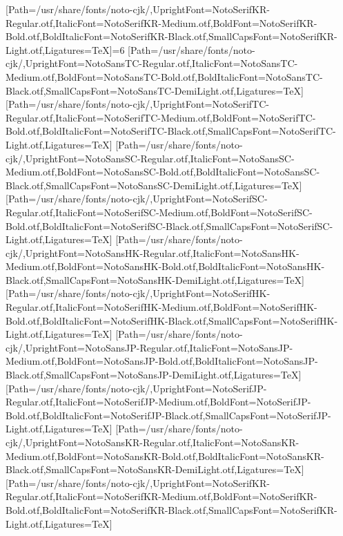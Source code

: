 \newfontfamily{}[Path=/usr/share/fonts/noto-cjk/,UprightFont=NotoSerifKR-Regular.otf,ItalicFont=NotoSerifKR-Medium.otf,BoldFont=NotoSerifKR-Bold.otf,BoldItalicFont=NotoSerifKR-Black.otf,SmallCapsFont=NotoSerifKR-Light.otf,Ligatures=TeX]\else\ifnum\value{NotoCJKFamily}=6
\newfontfamily{}[Path=/usr/share/fonts/noto-cjk/,UprightFont=NotoSansTC-Regular.otf,ItalicFont=NotoSansTC-Medium.otf,BoldFont=NotoSansTC-Bold.otf,BoldItalicFont=NotoSansTC-Black.otf,SmallCapsFont=NotoSansTC-DemiLight.otf,Ligatures=TeX]
\newfontfamily{}[Path=/usr/share/fonts/noto-cjk/,UprightFont=NotoSerifTC-Regular.otf,ItalicFont=NotoSerifTC-Medium.otf,BoldFont=NotoSerifTC-Bold.otf,BoldItalicFont=NotoSerifTC-Black.otf,SmallCapsFont=NotoSerifTC-Light.otf,Ligatures=TeX]
\newfontfamily{}[Path=/usr/share/fonts/noto-cjk/,UprightFont=NotoSansSC-Regular.otf,ItalicFont=NotoSansSC-Medium.otf,BoldFont=NotoSansSC-Bold.otf,BoldItalicFont=NotoSansSC-Black.otf,SmallCapsFont=NotoSansSC-DemiLight.otf,Ligatures=TeX]
\newfontfamily{}[Path=/usr/share/fonts/noto-cjk/,UprightFont=NotoSerifSC-Regular.otf,ItalicFont=NotoSerifSC-Medium.otf,BoldFont=NotoSerifSC-Bold.otf,BoldItalicFont=NotoSerifSC-Black.otf,SmallCapsFont=NotoSerifSC-Light.otf,Ligatures=TeX]
\newfontfamily{}[Path=/usr/share/fonts/noto-cjk/,UprightFont=NotoSansHK-Regular.otf,ItalicFont=NotoSansHK-Medium.otf,BoldFont=NotoSansHK-Bold.otf,BoldItalicFont=NotoSansHK-Black.otf,SmallCapsFont=NotoSansHK-DemiLight.otf,Ligatures=TeX]
\newfontfamily{}[Path=/usr/share/fonts/noto-cjk/,UprightFont=NotoSerifHK-Regular.otf,ItalicFont=NotoSerifHK-Medium.otf,BoldFont=NotoSerifHK-Bold.otf,BoldItalicFont=NotoSerifHK-Black.otf,SmallCapsFont=NotoSerifHK-Light.otf,Ligatures=TeX]
\newfontfamily{}[Path=/usr/share/fonts/noto-cjk/,UprightFont=NotoSansJP-Regular.otf,ItalicFont=NotoSansJP-Medium.otf,BoldFont=NotoSansJP-Bold.otf,BoldItalicFont=NotoSansJP-Black.otf,SmallCapsFont=NotoSansJP-DemiLight.otf,Ligatures=TeX]
\newfontfamily{}[Path=/usr/share/fonts/noto-cjk/,UprightFont=NotoSerifJP-Regular.otf,ItalicFont=NotoSerifJP-Medium.otf,BoldFont=NotoSerifJP-Bold.otf,BoldItalicFont=NotoSerifJP-Black.otf,SmallCapsFont=NotoSerifJP-Light.otf,Ligatures=TeX]
\newfontfamily{}[Path=/usr/share/fonts/noto-cjk/,UprightFont=NotoSansKR-Regular.otf,ItalicFont=NotoSansKR-Medium.otf,BoldFont=NotoSansKR-Bold.otf,BoldItalicFont=NotoSansKR-Black.otf,SmallCapsFont=NotoSansKR-DemiLight.otf,Ligatures=TeX]
\newfontfamily{}[Path=/usr/share/fonts/noto-cjk/,UprightFont=NotoSerifKR-Regular.otf,ItalicFont=NotoSerifKR-Medium.otf,BoldFont=NotoSerifKR-Bold.otf,BoldItalicFont=NotoSerifKR-Black.otf,SmallCapsFont=NotoSerifKR-Light.otf,Ligatures=TeX]

